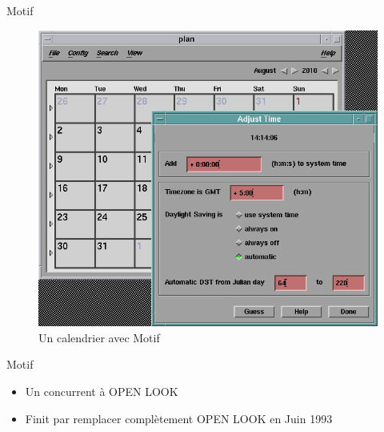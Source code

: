 \documentclass{beamer}
\begin{document}
  \begin{frame}{Motif}
    \begin{figure}[htb]
    \centering
    \includegraphics[scale=0.275]{"motif"}
    \caption{Un calendrier avec Motif}
    \label{fig:motif}
    \end{figure}
  \end{frame}
  \begin{frame}{Motif}
  \begin{itemize}
    \item Un concurrent à OPEN LOOK\\
    \item Finit par remplacer complètement OPEN LOOK en Juin 1993
  \end{itemize}
  \end{frame}
\end{document}
